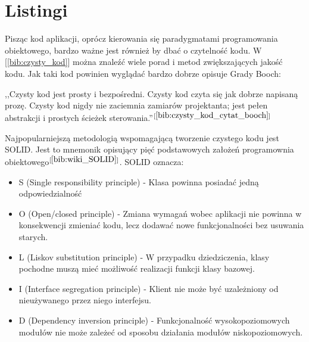 \section{Listingi}
Pisząc kod aplikacji, oprócz kierowania się paradygmatami programowania obiektowego, bardzo ważne jest również by dbać o czytelność kodu. W [\ref{bib:czysty_kod}] można znaleźć wiele porad i metod zwiększających jakość kodu. Jak taki kod powinien wyglądać bardzo dobrze opisuje Grady Booch:
\begin{center}
	,,Czysty kod jest prosty i bezpośredni. Czysty kod czyta się jak dobrze napisaną prozę. Czysty kod nigdy nie zaciemnia zamiarów projektanta; jest pełen abstrakcji i prostych ścieżek sterowania.''$^{[\ref{bib:czysty_kod_cytat_booch}]}$
\end{center}
Najpopularniejszą metodologią wspomagającą tworzenie czystego kodu jest SOLID. Jest to mnemonik opisujący pięć podstawowych założeń programownia obiektowego$^{[\ref{bib:wiki_SOLID}]}$. SOLID oznacza:
\begin{itemize}
	\item S (Single responsibility principle) - Klasa powinna posiadać jedną odpowiedzialność
	\item O (Open/closed principle) - Zmiana wymagań wobec aplikacji nie powinna w konsekwencji zmieniać kodu, lecz dodawać nowe funkcjonalności bez usuwania starych.
	\item L (Liskov substitution principle) - W przypadku dziedziczenia, klasy pochodne muszą mieć możliwość realizacji funkcji klasy bazowej.
	\item I (Interface segregation principle) - Klient nie może być uzależniony od nieużywanego przez niego interfejsu.
	\item D (Dependency inversion principle) - Funkcjonalność wysokopoziomowych modułów nie może zależeć od sposobu działania modułów niskopoziomowych.
\end{itemize}

